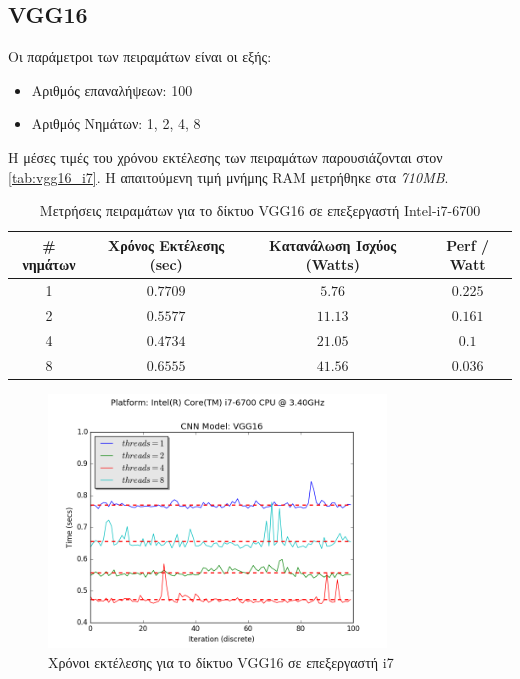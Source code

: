 
\subsection{VGG16}

Οι παράμετροι των πειραμάτων είναι οι εξής:
\begin{itemize}
  \item{Αριθμός επαναλήψεων: 100}
  \item{Αριθμός Νημάτων: 1, 2, 4, 8}
\end{itemize}

Η μέσες τιμές του χρόνου εκτέλεσης των πειραμάτων παρουσιάζονται στον \autoref{tab:vgg16_i7}.
Η απαιτούμενη τιμή μνήμης RAM μετρήθηκε στα \emph{710MB}.

\begin{table}[H]
  \begin{center}
    \caption{Μετρήσεις πειραμάτων για το δίκτυο VGG16 σε επεξεργαστή Intel-i7-6700}
    \label{tab:vgg16_i7}
    \begin{tabular}{ | c | c | c | c | }
      \hline
      \rowcolor{Gray}
      \# νημάτων & Χρόνος Εκτέλεσης (sec) & Κατανάλωση Ισχύος (Watts) & Perf / Watt \\
      \hline
      1 & $0.7709$ & $5.76$ & $0.225$ \\
      2 & $0.5577$ & $11.13$ & $0.161$ \\
      4 & $0.4734$ & $21.05$ & $0.1$ \\
      8 & $0.6555$ & $41.56$ & $0.036$ \\
      \hline
    \end{tabular}
  \end{center}
\end{table}

\begin{figure}[H]
  \centering
  \includegraphics[width=0.8\textwidth]{./images/chapter6/benchmark_vgg16_i7.png}
  \caption[Χρόνoι εκτέλεσης για το δίκτυο VGG16 σε επεξεργαστή i7]{Χρόνοι εκτέλεσης για το δίκτυο VGG16 σε επεξεργαστή i7}
  \label{fig:vgg16_results_i7}
\end{figure}



